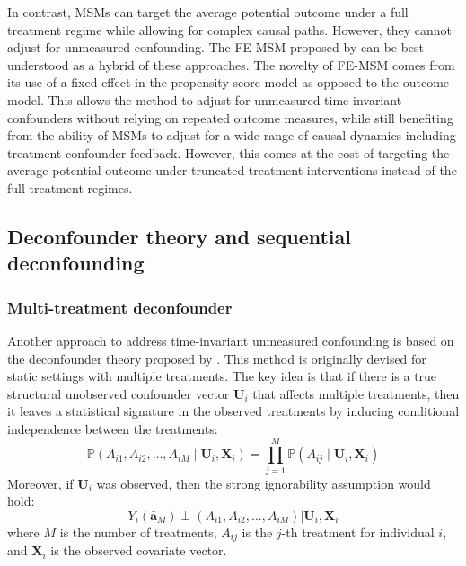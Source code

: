 In contrast, MSMs can target the average potential outcome under a full treatment regime while allowing for complex
causal paths. However, they cannot adjust for unmeasured confounding. 
The FE-MSM proposed by  can be best understood as a 
hybrid of these approaches. The novelty of FE-MSM comes from its use of a fixed-effect in 
the propensity score model as opposed to the outcome model. This allows the method 
to adjust for unmeasured time-invariant confounders without relying on repeated outcome measures, 
while still benefiting from the ability of MSMs to adjust for a wide range of causal dynamics 
including treatment-confounder feedback.  
However, this comes at the cost of targeting the average potential outcome under truncated treatment 
interventions instead of the full treatment regimes.

\subsection{Deconfounder theory and sequential deconfounding}
\subsubsection{Multi-treatment deconfounder}
Another approach to address time-invariant unmeasured confounding is based on the 
deconfounder theory proposed by . This method is originally 
devised for static settings with multiple treatments. The key idea is that if there is 
a true structural unobserved confounder vector $\mathbf{U}_i$ that affects multiple treatments, then it leaves a 
statistical signature in the observed treatments by inducing conditional independence 
between the treatments: 
$$\mathbb{P}(A_{i1}, A_{i2}, \ldots, A_{iM}\mid \mathbf{U}_i, \mathbf{X}_i) =  \prod_{j=1}^{M} \mathbb{P}(A_{ij}\mid \mathbf{U}_i, \mathbf{X}_i)$$
Moreover, if $\mathbf{U}_i$ was observed, then the strong ignorability assumption would hold:
$$Y_i(\bar{\mathbf{a}}_M) \perp (A_{i1}, A_{i2}, \ldots, A_{iM}) | \mathbf{U}_i, \mathbf{X}_i$$
where $M$ is the number of treatments, $A_{ij}$ is the $j$-th treatment for 
individual $i$, and $\mathbf{X}_i$ is the observed covariate vector. 

